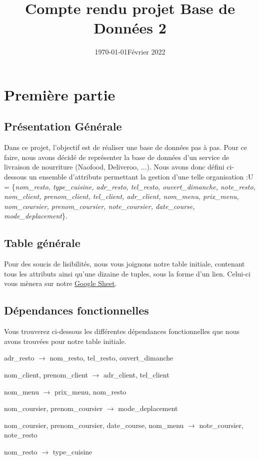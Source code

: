 \documentclass[french]{article}
\date{\today}
\title{Compte rendu projet Base de Données 2}
\author{\bsc{Billaud Maël} \and \bsc{Johan Quentin} \and \bsc{Ramé Tristan} \and \bsc{Goubon Valentin}}
\date{Février 2022}
\begin{document}


\maketitle

\section{Première partie}
    \subsection*{Présentation Générale}
        Dans ce projet, l'objectif est de réaliser une base de données pas à pas. Pour ce faire, nous avons décidé de représenter la base de données d'un service de livraison de nourriture (Naofood, Deliveroo, ...). Nous avons donc défini ci-dessous un ensemble d'attributs permettant la gestion d'une telle organisation :\newline U = \{\emph{nom\_resto, type\_cuisine, adr\_resto, tel\_resto, ouvert\_dimanche, note\_resto, nom\_client, prenom\_client, tel\_client, adr\_client, nom\_menu, prix\_menu, nom\_coursier, prenom\_coursier, note\_coursier, date\_course, mode\_deplacement}\}.
        

    \subsection*{Table générale}
        Pour des soucis de lisibilités, nous vous joignons notre table initiale, contenant tous les attributs ainsi qu'une dizaine de tuples, sous la forme d'un lien. Celui-ci vous mènera sur notre 
        \href{https://docs.google.com/spreadsheets/d/1HeSNFvLN3-yMfWHoYLVumzOeQpHXJHynqVBusbvl6EQ/edit?usp=sharing}{\underline{Google Sheet}}.
    
    
    
    \subsection*{Dépendances fonctionnelles}
        Vous trouverez ci-dessous les différentes dépendances fonctionnelles que nous avons trouvées pour notre table initiale.
        \begin{df}
            \item adr\_resto $\rightarrow$ nom\_resto, tel\_resto, ouvert\_dimanche
            \item nom\_client, prenom\_client $\rightarrow$ adr\_client, tel\_client
            \item nom\_menu $\rightarrow$ prix\_menu, nom\_resto
            \item nom\_coursier, prenom\_coursier $\rightarrow$  mode\_deplacement
            \item nom\_coursier, prenom\_coursier, date\_course, nom\_menu $\rightarrow$ note\_coursier, note\_resto
            \item nom\_resto $\rightarrow$ type\_cuisine
        \end{df}
        
\end{document}
